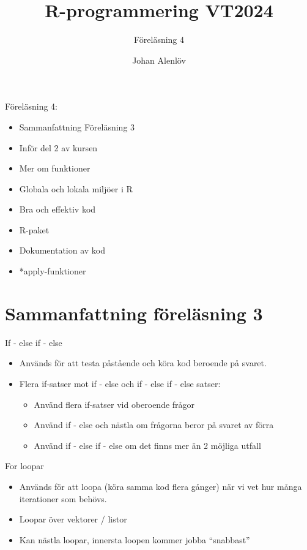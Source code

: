 \documentclass[
  11pt,
  ignorenonframetext,
]{beamer}
\title{R-programmering VT2024}
\subtitle{Föreläsning 4}
\author{Johan Alenlöv}
\date{}
\institute{Linköpings Universitet}
\providecommand{\tightlist}{%
  \setlength{\itemsep}{0pt}\setlength{\parskip}{0pt}}
\begin{document}
\frame{\titlepage}

\begin{frame}{Föreläsning 4:}
\label{fuxf6reluxe4sning-4}
\begin{itemize}
\tightlist
\item
  Sammanfattning Föreläsning 3
\item
  Inför del 2 av kursen
\item
  Mer om funktioner
\item
  Globala och lokala miljöer i R
\item
  Bra och effektiv kod
\item
  R-paket
\item
  Dokumentation av kod
\item
  *apply-funktioner
\end{itemize}
\end{frame}

\section{Sammanfattning föreläsning
3}\label{sammanfattning-fuxf6reluxe4sning-3}

\begin{frame}{If - else if - else}
\label{if---else-if---else}
\begin{itemize}
\tightlist
\item
  Används för att testa påstående och köra kod beroende på svaret.
\item
  Flera if-satser mot if - else och if - else if - else satser:

  \begin{itemize}
  \tightlist
  \item
    Använd flera if-satser vid oberoende frågor
  \item
    Använd if - else och nästla om frågorna beror på svaret av förra
  \item
    Använd if - else if - else om det finns mer än 2 möjliga utfall
  \end{itemize}
\end{itemize}
\end{frame}

\begin{frame}{For loopar}
\label{for-loopar}
\begin{itemize}
\tightlist
\item
  Används för att loopa (köra samma kod flera gånger) när vi vet hur
  många iterationer som behövs.
\item
  Loopar över vektorer / listor
\item
  Kan nästla loopar, innersta loopen kommer jobba ``snabbast''
\end{itemize}
\end{frame}
\end{document}
